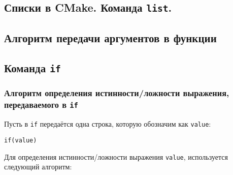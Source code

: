 \documentclass{article}
\begin{document}
\subsection*{Списки в CMake. Команда \texttt{list}.}

\subsection*{Алгоритм передачи аргументов в функции}

\subsection*{Команда \texttt{if}}

\subsubsection*{Алгоритм определения истинности/ложности выражения, передаваемого в \texttt{if}}
Пусть в \texttt{if} передаётся одна строка, которую обозначим как \texttt{value}:
\begin{verbatim}
if(value)
\end{verbatim}
Для определения истинности/ложности выражения \texttt{value}, используется следующий алгоритм:
\end{document}
